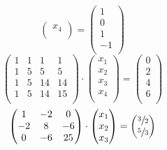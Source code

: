 \documentclass{report}
\begin{document}
\begin{enumerate}
\begin{equation}
\begin{pmatrix}
          x_4 \\
        \end{pmatrix}
        =
        \begin{pmatrix}
          1 \\
          0 \\
          1 \\
          -1 \\
        \end{pmatrix}
        \end{equation}
        \begin{equation}
        \begin{pmatrix}
		  1 & 1 & 1 & 1 \\
		  1 & 5 & 5 & 5 \\
		  1 & 5 & 14 & 14 \\
		  1 & 5 & 14 & 15 \\
        \end{pmatrix}
        \cdot
        \begin{pmatrix}
          x_1 \\
          x_2 \\
          x_3 \\
          x_4 \\
        \end{pmatrix}
        =
        \begin{pmatrix}
          0 \\
          2 \\
          4 \\
          6 \\
        \end{pmatrix}
        \end{equation}
        \begin{equation}
        \begin{pmatrix}
		  1 & -2 & 0 \\
		  -2 & 8 & -6 \\
		  0 & -6 & 25 \\
        \end{pmatrix}
        \cdot
        \begin{pmatrix}
          x_1 \\
          x_2 \\
          x_3 \\
        \end{pmatrix}
        =
        \begin{pmatrix}
          \sfrac{3}{2} \\
          \sfrac{5}{3} \\

\end{pmatrix}
\end{equation}
\end{enumerate}
\end{document}
